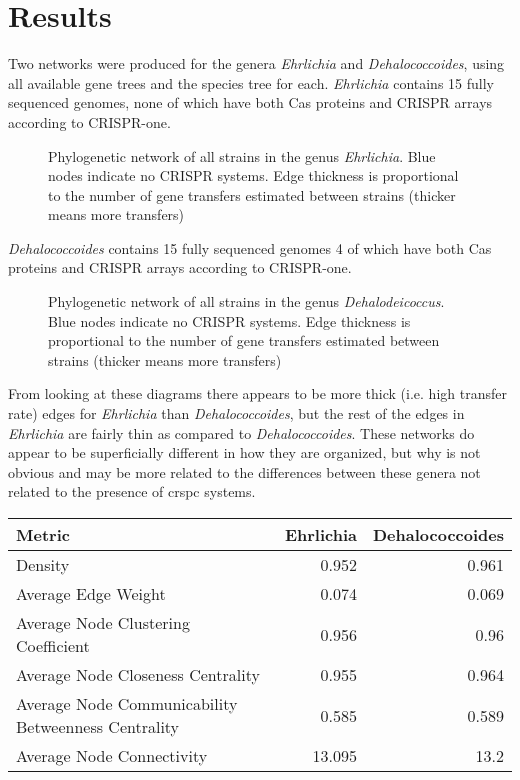 \section{Results}
Two networks were produced for the genera \textit{Ehrlichia} and \textit{Dehalococcoides}, using all available gene trees and the species tree for each.
\textit{Ehrlichia} contains 15 fully sequenced genomes, none of which have both Cas proteins and CRISPR arrays according to CRISPR-one.
\begin{figure}[htb!]
    \caption{Phylogenetic network of all strains in the genus \textit{Ehrlichia}. Blue nodes indicate no CRISPR systems. Edge thickness is proportional to the number of gene transfers estimated between strains (thicker means more transfers)}
\end{figure}
\FloatBarrier
\textit{Dehalococcoides} contains 15 fully sequenced genomes 4 of which have both Cas proteins and CRISPR arrays according to CRISPR-one.
\begin{figure}[htb!]
    \caption{Phylogenetic network of all strains in the genus \textit{Dehalodeicoccus}. Blue nodes indicate no CRISPR systems. Edge thickness is proportional to the number of gene transfers estimated between strains (thicker means more transfers)}
\end{figure}
\FloatBarrier
From looking at these diagrams there appears to be more thick (i.e. high transfer rate) edges for \textit{Ehrlichia} than \textit{Dehalococcoides}, but the rest of the edges in \textit{Ehrlichia} are fairly thin as compared to \textit{Dehalococcoides}.
These networks do appear to be superficially different in how they are organized, but why is not obvious and may be more related to the differences between these genera not related to the presence of \ac{crspc} systems.
\begin{center}
    \begin{tabular}{l|r r}
        Metric & Ehrlichia & Dehalococcoides\\
        \hline
        Density & 0.952&0.961\\
        Average Edge Weight & 0.074&0.069\\
        Average Node Clustering Coefficient & 0.956&0.96\\
        Average Node Closeness Centrality & 0.955&0.964\\
        Average Node Communicability Betweenness Centrality & 0.585 &0.589\\
        Average Node Connectivity & 13.095 & 13.2\\
    \end{tabular}
\end{center}
